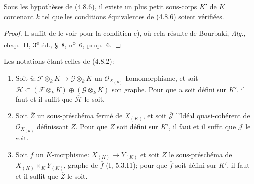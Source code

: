\begin{corollary}[4.8.7]
\label{IV.2.4.8.7-fr}
Sous les hypothèses de (4.8.6), il existe un plus petit sous-corps $K'$ de $K$
contenant $k$ tel que les conditions équivalentes de (4.8.6) soient vérifiées.
\end{corollary}

\begin{proof}
Il suffit de le voir pour la condition c), où cela résulte de Bourbaki,
\emph{Alg.}, chap.~II, 3\textsuperscript{e} éd., \S~8,
n\textsuperscript{o}~6, prop.~6.
\end{proof}

\begin{lemma}[4.8.8]
\label{IV.2.4.8.8-fr}
Les notations étant celles de (4.8.2):
\begin{enumerate}
\item[(i)] Soit
$\overline u:\mathscr F\otimes_kK\to\mathscr G\otimes_kK$ un
$\mathcal O_{X_{(K)}}$-homomorphisme, et soit
$\overline{\mathscr H}\subset
(\mathscr F\otimes_kK)\oplus(\mathscr G\otimes_kK)$ son graphe. Pour que
$\overline u$ soit défini sur $K'$, il faut et il suffit que
$\overline{\mathscr H}$ le soit.
\item[(ii)] Soit $\overline Z$ un sous-préschéma fermé de $X_{(K)}$, et soit
$\overline{\mathscr J}$ l'Idéal quasi-cohérent de $\mathcal O_{X_{(K)}}$
définissant $\overline Z$. Pour que $\overline Z$ soit défini sur $K'$, il
faut et il suffit que $\overline{\mathscr J}$ le soit.
\item[(iii)] Soit $\overline f$ un $K$-morphisme:
$X_{(K)}\to Y_{(K)}$ et soit $\overline Z$ le sous-préschéma de
$X_{(K)}\times_KY_{(K)}$, graphe de $\overline f$ (I, 5.3.11); pour que
$\overline f$ soit défini sur $K'$, il faut et il suffit que $\overline Z$ le
soit.
\end{enumerate}
\end{lemma}

